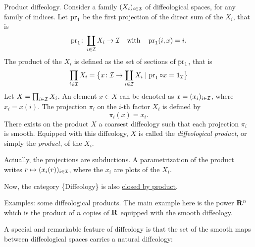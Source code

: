 \begin{Article}{Product diffeology.}
  Consider a family $(X_i)_{i \in \mathcal{I}}$ of diffeological spaces,
  for any family of indices.
  Let $\operatorname{pr}_1$ be the first projection of the direct sum of the $X_i$,
  that is
  $$%
    \Proj_1 \colon \coprod_{i \in \cI} X_i \to \cI
    \quad \text{with} \quad
    \Proj_1(i,x) = i.
    $$%
  The product of the $X_i$ is defined as the set of sections of $\operatorname{pr}_1$,
  that is
  $$%
    \prod_{i \in \cI} X_i = \big\{ x \colon \cI \to \coprod_{i \in \cI} X_i \mid \Proj_1 \circ x = \Id_\cI \big\}
    $$%
  Let $X = \prod_{i \in \mathcal{I}} X_i$.
  An element $x \in X$ can be denoted as $x = (x_i)_{i \in \mathcal{I}}$,
  where $x_i = x(i)$.
  The projection $\pi_i$ on the $i$-th factor $X_i$ is defined by
  $$%
    \pi_i(x) = x_i.
    $$%
  There exists on the product $X$ a coarsest diffeology such that each projection $\pi_i$ is smooth.
  Equipped with this diffeology,
  $X$ is called the \emph{diffeological product},
  or simply the \emph{product},
  of the $X_i$.
  
  Actually,
  the projections are subductions.
  A parametrization of the product writes $r \mapsto (x_i(r))_{i \in \mathcal{I}}$,
  where the $x_i$ are plots of the $X_i$.
  
  Now,
  the category \{Diffeology\} is also \uline{closed by product}.
\end{Article}

\begin{Article}{Examples: some diffeological products.}
  The main example here is the power $\mathbf{R}^n$ which is the product of $n$ copies of $\mathbf{R}$ equipped with the smooth diffeology.
\end{Article}

A special and remarkable feature of diffeology is that the set of the smooth maps between diffeological spaces carries a natural diffeology:

